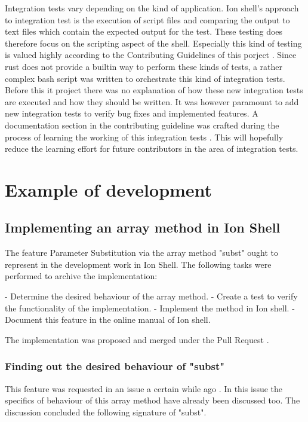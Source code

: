 Integration tests vary depending on the kind of application.
Ion shell's approach to integration test is the execution of script files
and comparing the output to text files which contain the expected output for the test.
These testing does therefore focus on the scripting aspect of the shell.
Especially this kind of testing is valued highly according to the Contributing Guidelines of this porject \cite{ion_shell_contributing}.
Since rust does not provide a builtin way to perform these kinds of tests,
a rather complex bash script was written to orchestrate this kind of integration tests.
Before this it project there was no explanation of how these new integration tests are executed and how they should be written.
It was however paramount to add new integration tests to verify bug fixes and implemented features.
A documentation section in the contributing guideline was crafted during the process of
learning the working of this integration tests \cite{ion_shell_contributing}.
This will hopefully reduce the learning effort for future contributors in the area of integration tests.

\section{Example of development}

\subsection{Implementing an array method in Ion Shell}

The feature Parameter Substitution via the array method "subst" ought to represent in the development work in Ion Shell.
The following tasks were performed to archive the implementation:

- Determine the desired behaviour of the array method.
- Create a test to verify the functionality of the implementation.
- Implement the method in Ion shell.
- Document this feature in the online manual of Ion shell.

The implementation was proposed and merged under the Pull Request \cite{pr_subst_method}.

\subsubsection{Finding out the desired behaviour of "subst"}

This feature was requested in an issue a certain while ago \cite{ion_shell_subst_issue}.
In this issue the specifics of behaviour of this array method have already been discussed too.
The discussion concluded the following signature of "subst".

